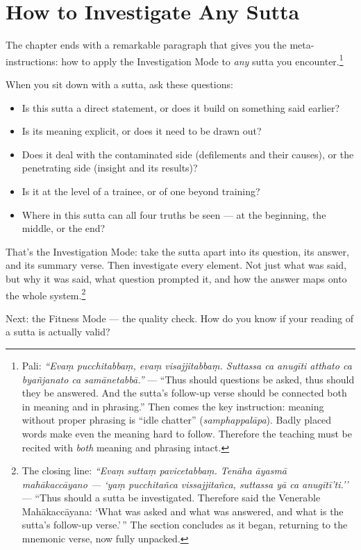 \section*{How to Investigate Any Sutta}

The chapter ends with a remarkable paragraph that gives you the meta-instructions: how to apply the Investigation Mode to \textit{any} sutta you encounter.\footnote{Pali: \textit{``Evaṃ pucchitabbaṃ, evaṃ visajjitabbaṃ. Suttassa ca anugīti atthato ca byañjanato ca samānetabbā.''} --- ``Thus should questions be asked, thus should they be answered. And the sutta's follow-up verse should be connected both in meaning and in phrasing.'' Then comes the key instruction: meaning without proper phrasing is ``idle chatter'' (\textit{samphappalāpa}). Badly placed words make even the meaning hard to follow. Therefore the teaching must be recited with \textit{both} meaning and phrasing intact.}

When you sit down with a sutta, ask these questions:

\begin{itemize}[itemsep=4pt]
\item Is this sutta a direct statement, or does it build on something said earlier?
\item Is its meaning explicit, or does it need to be drawn out?
\item Does it deal with the contaminated side (defilements and their causes), or the penetrating side (insight and its results)?
\item Is it at the level of a trainee, or of one beyond training?
\item Where in this sutta can all four truths be seen --- at the beginning, the middle, or the end?
\end{itemize}

That's the Investigation Mode: take the sutta apart into its question, its answer, and its summary verse. Then investigate every element. Not just what was said, but why it was said, what question prompted it, and how the answer maps onto the whole system.\footnote{The closing line: \textit{``Evaṃ suttaṃ pavicetabbaṃ. Tenāha āyasmā mahākaccāyano --- `yaṃ pucchitañca vissajjitañca, suttassa yā ca anugītī'ti.''} --- ``Thus should a sutta be investigated. Therefore said the Venerable Mahākaccāyana: `What was asked and what was answered, and what is the sutta's follow-up verse.'\,'' The section concludes as it began, returning to the mnemonic verse, now fully unpacked.}

\ornament

\noindent Next: the Fitness Mode --- the quality check. How do you know if your reading of a sutta is actually valid?
